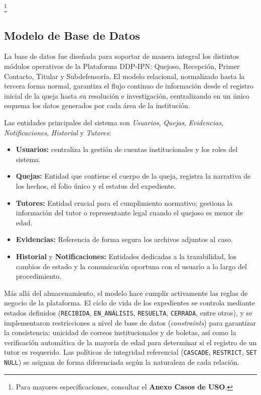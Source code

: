\footnote{Para mayores especificaciones, consultar el \textbf{Anexo Casos de USO}.}


\subsection{Modelo de Base de Datos}
\label{subsec:modelo_bd}

La base de datos fue diseñada para soportar de manera integral los distintos módulos operativos de la Plataforma DDP-IPN: Quejoso, Recepción, Primer Contacto, Titular y Subdefensoría. El modelo relacional, normalizado hasta la tercera forma normal, garantiza el flujo continuo de información desde el registro inicial de la queja hasta su resolución e investigación, centralizando en un único esquema los datos generados por cada área de la institución.

Las entidades principales del sistema son \textit{Usuarios}, \textit{Quejas},
\textit{Evidencias}, \textit{Notificaciones}, \textit{Historial} y \textit{Tutores}:

\begin{itemize}
    \item \textbf{Usuarios:} centraliza la gestión de cuentas institucionales y los roles del sistema.
    \item \textbf{Quejas:} Entidad que contiene el cuerpo de la queja, registra la narrativa de los hechos, el folio único y el estatus del expediente.
    \item \textbf{Tutores:} Entidad crucial para el cumplimiento normativo; gestiona la información del tutor o representante legal cuando el quejoso es menor de edad.
    \item \textbf{Evidencias:} Referencia de forma segura los archivos adjuntos al caso.
    \item \textbf{Historial} y \textbf{Notificaciones:} Entidades dedicadas a la trazabilidad, los cambios de estado y la comunicación oportuna con el usuario a lo largo del procedimiento.
\end{itemize}

Más allá del almacenamiento, el modelo hace cumplir activamente las reglas de negocio de la plataforma. El ciclo de vida de los expedientes se controla mediante estados definidos (\texttt{RECIBIDA}, \texttt{EN\_ANÁLISIS},
\texttt{RESUELTA}, \texttt{CERRADA}, entre otros), y se implementaron restricciones a nivel de base de datos (\textit{constraints}) para garantizar la consistencia: unicidad de correos institucionales y de boletas, así como la verificación automática de la mayoría de edad para determinar si el registro de un tutor es requerido. Las políticas de integridad referencial
(\texttt{CASCADE}, \texttt{RESTRICT}, \texttt{SET NULL}) se asignan de forma diferenciada según la naturaleza de cada relación.

